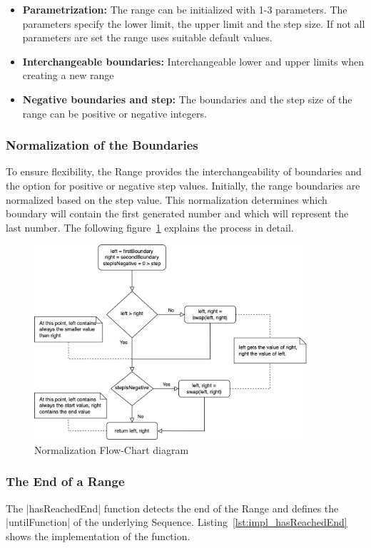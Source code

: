 \begin{itemize}
  \item{\textbf{Parametrization:} The range can be initialized with 1-3 parameters. The parameters specify the lower limit, the upper limit and the
  step size. If not all parameters are set the range uses suitable default values.}
  \item{\textbf{Interchangeable boundaries:} Interchangeable lower and upper limits when creating a new range}
  \item{\textbf{Negative boundaries and step:} The boundaries and the step size of the range can be positive or negative integers.}
\end{itemize}

\subsubsection{Normalization of the Boundaries}
\label{subsub:Normalization of the Boundaries}
To ensure flexibility, the Range provides the interchangeability of boundaries
and the option for positive or negative step values. Initially, the range
boundaries are normalized based on the step value. This normalization
determines which boundary will contain the first generated number and which
will represent the last number.
The following figure~\ref{fig:norm-flowchart} explains the process in detail.

\begin{figure}[H]
    \centering
    \includegraphics[width=0.9\textwidth]{mainmatter/pictures/boundary-normalization.png}
    \caption{Normalization Flow-Chart diagram}
    \label{fig:norm-flowchart}
\end{figure}

\subsubsection{The End of a Range}
\label{subsub:The End of a Range}
The |hasReachedEnd| function detects the end of the Range and defines the
|untilFunction| of the underlying Sequence. Listing~\ref{lst:impl_hasReachedEnd}
shows the implementation of the function. 

